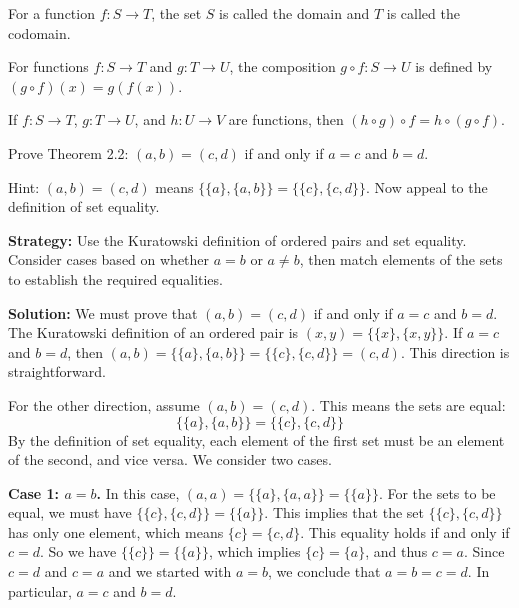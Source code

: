 \begin{definition}
For a function $f: S \to T$, the set $S$ is called the domain and $T$ is called the codomain.
\end{definition}

\begin{definition}
For functions $f: S \to T$ and $g: T \to U$, the composition $g \circ f: S \to U$ is defined by $(g \circ f)(x) = g(f(x))$.
\end{definition}

\begin{theorem}
If $f: S \to T$, $g: T \to U$, and $h: U \to V$ are functions, then $(h \circ g) \circ f = h \circ (g \circ f)$.
\end{theorem}



\begin{problembox}
\begin{problemstatement}
Prove Theorem 2.2: $(a, b) = (c, d)$ if and only if $a=c$ and $b=d$.

Hint: $(a, b) = (c, d)$ means $\{\{a\}, \{a, b\}\} = \{\{c\}, \{c, d\}\}$. Now appeal to the definition of set equality.
\end{problemstatement}
\end{problembox}

\noindent\textbf{Strategy:} Use the Kuratowski definition of ordered pairs and set equality. Consider cases based on whether $a=b$ or $a\neq b$, then match elements of the sets to establish the required equalities.

\bigskip\noindent\textbf{Solution:}  
We must prove that $(a, b) = (c, d)$ if and only if $a=c$ and $b=d$.
The Kuratowski definition of an ordered pair is $(x, y) = \{\{x\}, \{x, y\}\}$.
If $a=c$ and $b=d$, then $(a,b) = \{\{a\}, \{a,b\}\} = \{\{c\}, \{c,d\}\} = (c,d)$. This direction is straightforward.

For the other direction, assume $(a, b) = (c, d)$. This means the sets are equal:
\[ \{\{a\}, \{a, b\}\} = \{\{c\}, \{c, d\}\} \]
By the definition of set equality, each element of the first set must be an element of the second, and vice versa. We consider two cases.

\textbf{Case 1: $a=b$.}
In this case, $(a, a) = \{\{a\}, \{a, a\}\} = \{\{a\}\}$.
For the sets to be equal, we must have $\{\{c\}, \{c, d\}\} = \{\{a\}\}$. This implies that the set $\{\{c\}, \{c, d\}\}$ has only one element, which means $\{c\} = \{c, d\}$. This equality holds if and only if $c=d$.
So we have $\{\{c\}\} = \{\{a\}\}$, which implies $\{c\} = \{a\}$, and thus $c=a$.
Since $c=d$ and $c=a$ and we started with $a=b$, we conclude that $a = b = c = d$. In particular, $a=c$ and $b=d$.

